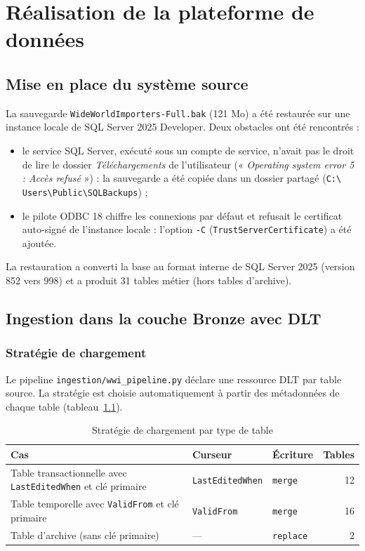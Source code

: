 \chapter{Réalisation de la plateforme de données}
\label{ch:realisation}

\section{Mise en place du système source}

La sauvegarde \texttt{WideWorldImporters-Full.bak} (121 Mo) a été restaurée sur une instance locale de
SQL Server 2025 Developer. Deux obstacles ont été rencontrés :
\begin{itemize}
  \item le service SQL Server, exécuté sous un compte de service, n'avait pas le droit de lire le dossier
        \emph{Téléchargements} de l'utilisateur (« \emph{Operating system error 5 : Accès refusé} ») :
        la sauvegarde a été copiée dans un dossier partagé (\texttt{C:\textbackslash
        Users\textbackslash Public\textbackslash SQLBackups}) ;
  \item le pilote ODBC 18 chiffre les connexions par défaut et refusait le certificat auto-signé de
        l'instance locale : l'option \texttt{-C} (\texttt{TrustServerCertificate}) a été ajoutée.
\end{itemize}
La restauration a converti la base au format interne de SQL Server 2025 (version 852 vers 998) et a
produit 31 tables métier (hors tables d'archive).

\section{Ingestion dans la couche Bronze avec DLT}
\label{sec:bronze}

\subsection{Stratégie de chargement}
Le pipeline \texttt{ingestion/wwi\_pipeline.py} déclare une ressource DLT par table source. La
stratégie est choisie automatiquement à partir des métadonnées de chaque table
(tableau~\ref{tab:strategie}).

\begin{table}[H]
\centering
\caption{Stratégie de chargement par type de table}
\label{tab:strategie}
\begin{tabularx}{\linewidth}{@{}X l l r@{}}
\toprule
\textbf{Cas} & \textbf{Curseur} & \textbf{Écriture} & \textbf{Tables} \\
\midrule
Table transactionnelle avec \texttt{LastEditedWhen} et clé primaire & \texttt{LastEditedWhen} & \texttt{merge} & 12 \\
Table temporelle avec \texttt{ValidFrom} et clé primaire & \texttt{ValidFrom} & \texttt{merge} & 16 \\
Table d'archive (sans clé primaire) & --- & \texttt{replace} & 2 \\
\bottomrule
\end{tabularx}
\end{table}

